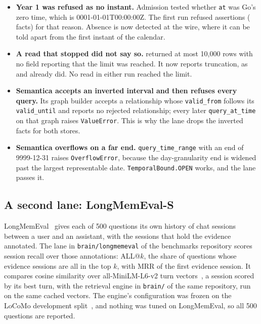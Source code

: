 \begin{itemize}[leftmargin=*,itemsep=2pt]
\item \textbf{Year 1 was refused as no instant.} Admission tested whether
  \texttt{at} was Go's zero time, which is 0001-01-01T00:00:00Z. The first run
  refused  assertions (
  facts) for that reason. Absence is now detected at the wire, where it can be
  told apart from the first instant of the calendar.
\item \textbf{A read that stopped did not say so.}  returned at
  most 10{,}000 rows with no field reporting that the limit was reached. It now
  reports truncation, as  and  already did. No read in
  either run reached the limit.
\item \textbf{Semantica accepts an inverted interval and then refuses every
  query.} Its graph builder accepts a relationship whose \texttt{valid\_from}
  follows its \texttt{valid\_until} and reports no rejected relationship; every
  later \texttt{query\_at\_time} on that graph raises \texttt{ValueError}. This is why the lane drops the 
  inverted facts for both stores.
\item \textbf{Semantica overflows on a far end.}
  \texttt{query\_time\_range} with an end of 9999-12-31 raises
  \texttt{OverflowError}, because the day-granularity end is widened past the
  largest representable date. \texttt{TemporalBound.OPEN} works, and the lane
  passes it.
\end{itemize}

\subsection{A second lane: LongMemEval-S}
\label{sec:eval-lme}

LongMemEval~\cite{wu2025longmemeval} gives each of 500 questions its own history
of chat sessions between a user and an assistant, with the sessions that hold
the evidence annotated. The lane in \texttt{brain/longmemeval} of the benchmarks
repository scores session recall over those annotations: ALL@$k$, the share of
questions whose evidence sessions are all in the top $k$, with MRR of the first
evidence session. It compares cosine similarity over all-MiniLM-L6-v2 turn
vectors~\cite{reimers2019sbert}, a session scored by its best turn, with the
retrieval engine in \texttt{brain/} of the same repository, run on the same
cached vectors. The engine's configuration was frozen on the LoCoMo development
split~\cite{locomo}, and nothing was tuned on LongMemEval, so all 500 questions
are reported.

